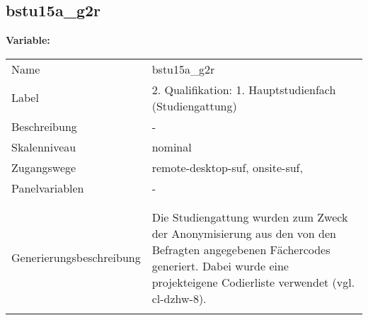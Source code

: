 	
	
	\subsection{bstu15a\_g2r}
	\label{subSection:bstu15a_g2r}

	\noindent\textbf{Variable:}\\
		\begin{tabular}{lL{11.3cm}}
			\label{tableVariable:bstu15a_g2r}
			Name & bstu15a\_g2r \\
			Label & 2. Qualifikation: 1. Hauptstudienfach (Studiengattung) \\
			Beschreibung & - \\
			Skalenniveau & nominal \\
			Zugangswege &
				remote-desktop-suf,
				onsite-suf,
 \\
			Panelvariablen & -
			 \\
			 \\
 \\
					Generierungsbeschreibung & Die Studiengattung wurden zum Zweck der Anonymisierung aus den von den Befragten angegebenen Fächercodes generiert.  Dabei wurde eine projekteigene Codierliste verwendet (vgl. cl-dzhw-8).
				 \\	
			 \\
		\end{tabular}






